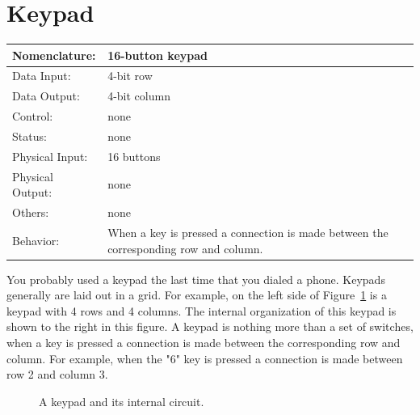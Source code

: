 \section{Keypad}
\label{page:keypad}
\begin{tabular}{|l|p{3.5in}|} \hline
Nomenclature:  & 16-button keypad                           \\ \hline
Data Input:    & 4-bit row        \\ \hline
Data Output:   & 4-bit column   \\ \hline
Control:       & none           \\ \hline
Status:        & none                                   \\ \hline
Physical Input:& 16 buttons		\\ \hline
Physical Output:& none		\\ \hline
Others:        & none                   \\ \hline
Behavior:      & When a key is pressed a connection is made between
the corresponding row and column. \\ \hline
\end{tabular}

You probably used a keypad the last time that you dialed a phone.
Keypads generally are laid out in a grid.
For example, on the left side of Figure~\ref{fig:keypad} 
is a keypad with 4 rows and 4 columns.  The internal organization
of this keypad is shown to the right in this figure.  A keypad is
nothing more than a set of switches, when a key is pressed a connection
is made between the corresponding row and column.  For example, when
the "6" key is pressed a connection is made between row 2 and column
3.

\begin{figure}[ht]
\caption{A keypad and its internal circuit.}
\label{fig:keypad}
\end{figure}

